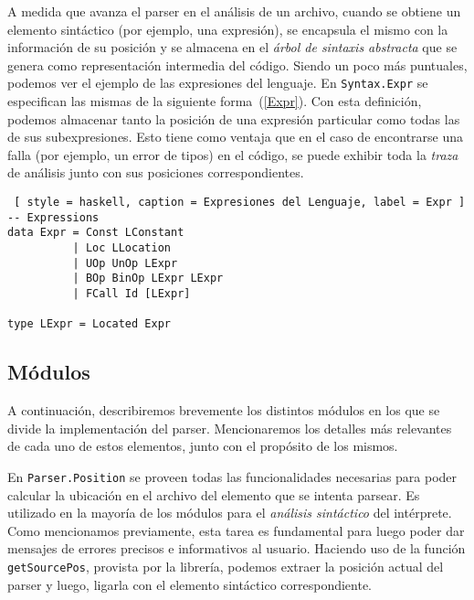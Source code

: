 A medida que avanza el parser en el análisis de un archivo, cuando se obtiene un elemento sintáctico (por ejemplo, una expresión), se encapsula el mismo con la información de su posición y se almacena en el \textit{árbol de sintaxis abstracta} que se genera como representación intermedia del código.
Siendo un poco más puntuales, podemos ver el ejemplo de las expresiones del lenguaje.
En \lstinline[style = module]{Syntax.Expr} se especifican las mismas de la siguiente forma~(\ref{Expr}).
Con esta definición, podemos almacenar tanto la posición de una expresión particular como todas las de sus subexpresiones.
Esto tiene como ventaja que en el caso de encontrarse una falla (por ejemplo, un error de tipos) en el código, se puede exhibir toda la \textit{traza} de análisis junto con sus posiciones correspondientes. 

\begin{lstlisting} [ style = haskell, caption = Expresiones del Lenguaje, label = Expr ]
-- Expressions
data Expr = Const LConstant
          | Loc LLocation
          | UOp UnOp LExpr
          | BOp BinOp LExpr LExpr
          | FCall Id [LExpr]

type LExpr = Located Expr
\end{lstlisting}

\subsection{Módulos}

A continuación, describiremos brevemente los distintos módulos en los que se divide la implementación del parser.
Mencionaremos los detalles más relevantes de cada uno de estos elementos, junto con el propósito de los mismos.

En \lstinline[style = module]{Parser.Position} se proveen todas las funcionalidades necesarias para poder calcular la ubicación en el archivo del elemento que se intenta parsear.
Es utilizado en la mayoría de los módulos para el \textit{análisis sintáctico} del intérprete.
Como mencionamos previamente, esta tarea es fundamental para luego poder dar mensajes de errores precisos e informativos al usuario.
Haciendo uso de la función \lstinline[style = haskell]{getSourcePos}, provista por la librería, podemos extraer la posición actual del parser y luego, ligarla con el elemento sintáctico correspondiente.

